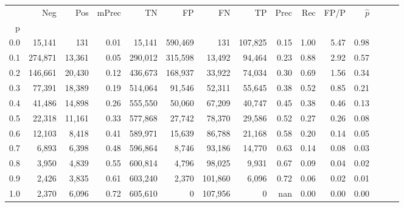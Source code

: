 \begin{tabular}{rrrrrrrrrrrrrrr}
\toprule
{} &      Neg &     Pos & mPrec &       TN &       FP &       FN &       TP &  Prec &   Rec &  FP/P & $\hat{p}$ \\
p   &          &         &       &          &          &          &          &       &       &       &           \\
\midrule
0.0 &   15,141 &     131 &  0.01 &   15,141 &  590,469 &      131 &  107,825 &  0.15 &  1.00 &  5.47 &      0.98 \\
0.1 &  274,871 &  13,361 &  0.05 &  290,012 &  315,598 &   13,492 &   94,464 &  0.23 &  0.88 &  2.92 &      0.57 \\
0.2 &  146,661 &  20,430 &  0.12 &  436,673 &  168,937 &   33,922 &   74,034 &  0.30 &  0.69 &  1.56 &      0.34 \\
0.3 &   77,391 &  18,389 &  0.19 &  514,064 &   91,546 &   52,311 &   55,645 &  0.38 &  0.52 &  0.85 &      0.21 \\
0.4 &   41,486 &  14,898 &  0.26 &  555,550 &   50,060 &   67,209 &   40,747 &  0.45 &  0.38 &  0.46 &      0.13 \\
0.5 &   22,318 &  11,161 &  0.33 &  577,868 &   27,742 &   78,370 &   29,586 &  0.52 &  0.27 &  0.26 &      0.08 \\
0.6 &   12,103 &   8,418 &  0.41 &  589,971 &   15,639 &   86,788 &   21,168 &  0.58 &  0.20 &  0.14 &      0.05 \\
0.7 &    6,893 &   6,398 &  0.48 &  596,864 &    8,746 &   93,186 &   14,770 &  0.63 &  0.14 &  0.08 &      0.03 \\
0.8 &    3,950 &   4,839 &  0.55 &  600,814 &    4,796 &   98,025 &    9,931 &  0.67 &  0.09 &  0.04 &      0.02 \\
0.9 &    2,426 &   3,835 &  0.61 &  603,240 &    2,370 &  101,860 &    6,096 &  0.72 &  0.06 &  0.02 &      0.01 \\
1.0 &    2,370 &   6,096 &  0.72 &  605,610 &        0 &  107,956 &        0 &   nan &  0.00 &  0.00 &      0.00 \\
\bottomrule
\end{tabular}
